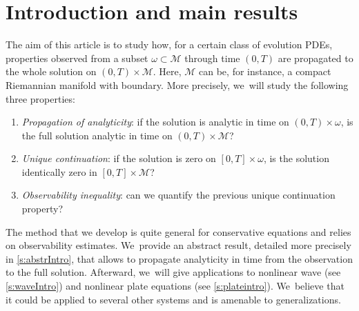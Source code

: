 \documentclass[JEP,XML,SOM,Unicode,published]{cedram}
\theoremstyle{definition}
\let\mc\mathcal
\newcommand{\M}{\mc{M}}
\begin{document}
\section{Introduction and main results}
The aim of this article is to study how, for a certain class of evolution PDEs, properties observed from a subset $\omega\subset \M$ through time $(0, T)$ are propagated to the whole solution on $(0, T)\times \M$. Here, $\M$ can be, for instance, a compact Riemannian manifold with boundary. More precisely, we~will study the following three properties:
\begin{enumerate}
\item \emph{Propagation of analyticity}: if the solution is analytic in time on $(0,T)\times \omega$, is the full solution analytic in time on $(0,T)\times\M$?
\item \emph{Unique continuation}: if the solution is zero on $[0, T]\times \omega$, is the solution identically zero in $[0, T]\times\M$?
\item \emph{Observability inequality}: can we quantify the previous unique continuation property?
\end{enumerate}
The method that we develop is quite general for conservative equations and relies on observability estimates. We~provide an abstract result, detailed more precisely in \cref{s:abstrIntro}, that allows to propagate analyticity in time from the observation to the full solution. Afterward, we~will give applications to nonlinear wave (see \cref{s:waveIntro}) and nonlinear plate equations (see \cref{s:plateintro}). We~believe that it could be applied to several other systems and is amenable to generalizations.
\end{document}
